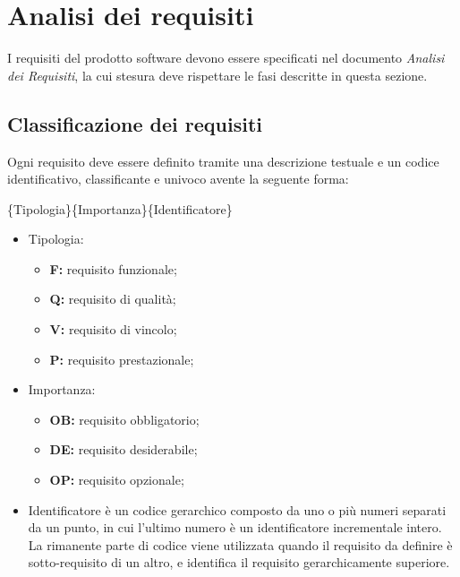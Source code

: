 \section{Analisi dei requisiti}
I requisiti del prodotto software devono essere specificati nel documento \emph{Analisi dei Requisiti}, la cui stesura deve rispettare le fasi descritte in questa sezione.

\subsection{Classificazione dei requisiti}
Ogni requisito deve essere definito tramite  una descrizione testuale e un codice identificativo, classificante e univoco avente la seguente forma:

\begin{center}\{Tipologia\}\{Importanza\}\{Identificatore\}\end{center}


\begin{itemize}

\item Tipologia:
\begin{itemize}
\item \textbf{F:} requisito funzionale;
\item \textbf{Q:} requisito di qualità;
\item \textbf{V:} requisito di vincolo;
\item \textbf{P:} requisito prestazionale;
\end{itemize}

\item Importanza:
\begin{itemize}
\item \textbf{OB:} requisito obbligatorio;
\item \textbf{DE:} requisito desiderabile;
\item \textbf{OP:} requisito opzionale;
\end{itemize}

\item Identificatore è un codice gerarchico composto da uno o più numeri separati da un punto, in cui l'ultimo numero è un identificatore incrementale intero.\\
La rimanente parte di codice viene utilizzata quando il requisito da definire è sotto-requisito di un altro, e identifica il requisito gerarchicamente superiore.

\end{itemize}

